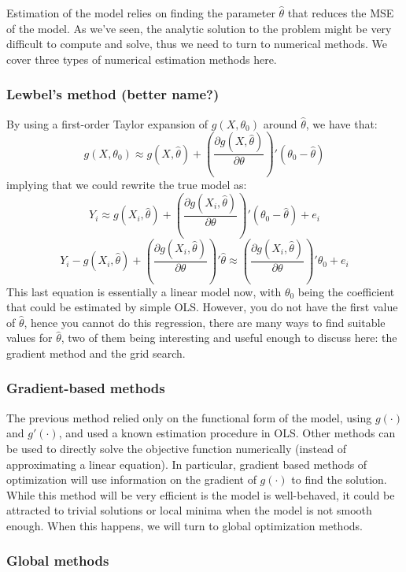 Estimation of the model relies on finding the parameter $\hat\theta$ that reduces the MSE of the model. As we've seen, the analytic solution to the problem might be very difficult to compute and solve, thus we need to turn to numerical methods. We cover three types of numerical estimation methods here.

\subsubsection{Lewbel's method (better name?)}

By using a first-order Taylor expansion of $g(X, \theta_0)$ around $\hat\theta$, we have that: $$g(X, \theta_0)\approx g(X,\hat\theta) + \left(\frac{\partial g(X,\hat\theta)}{\partial \theta}\right)'(\theta_0 - \hat\theta) $$ implying that we could rewrite the true model as: $$Y_i \approx g(X_i,\hat\theta) + \left(\frac{\partial g(X_i,\hat\theta)}{\partial \theta}\right)'(\theta_0 - \hat\theta) + e_i $$ $$ Y_i - g(X_i,\hat\theta) + \left(\frac{\partial g(X_i,\hat\theta)}{\partial \theta}\right)'\hat\theta \approx \left(\frac{\partial g(X_i,\hat\theta)}{\partial \theta}\right)'\theta_0 + e_i $$ This last equation is essentially a linear model now, with $\theta_0$ being the coefficient that could be estimated by simple OLS. However, you do not have the first value of $\hat\theta$, hence you cannot do this regression, there are many ways to find suitable values for $\hat\theta$, two of them being interesting and useful enough to discuss here: the gradient method and the grid search.

\subsubsection{Gradient-based methods}

The previous method relied only on the functional form of the model, using $g(\cdot)$ and $g'(\cdot)$, and used a known estimation procedure in OLS. Other methods can be used to directly solve the objective function numerically (instead of approximating a linear equation). In particular, gradient based methods of optimization will use information on the gradient of $g(\cdot)$ to find the solution. While this method will be very efficient is the model is well-behaved, it could be attracted to trivial solutions or local minima when the model is not smooth enough. When this happens, we will turn to global optimization methods. 

\subsubsection{Global methods}

